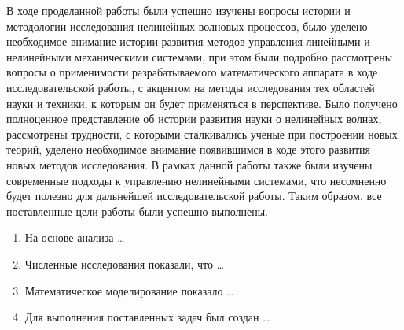 

В ходе проделанной работы были успешно изучены вопросы истории и методологии исследования нелинейных волновых процессов, было уделено необходимое внимание истории развития методов управления линейными и нелинейными механическими системами, при этом были подробно рассмотрены вопросы о применимости разрабатываемого математического аппарата в ходе исследовательской работы, с акцентом на методы исследования тех областей науки и техники, к которым он будет применяться в перспективе.
Было получено полноценное представление об истории развития науки о нелинейных волнах, рассмотрены трудности, с которыми сталкивались ученые при построении новых теорий, уделено необходимое внимание появившимся в ходе этого развития новых методов исследования. В рамках данной работы также были изучены современные подходы к управлению нелинейными системами, что несомненно будет полезно для дальнейшей исследовательской работы. Таким образом, все поставленные цели работы были успешно выполнены.

\begin{enumerate}
  \item На основе анализа \ldots
  \item Численные исследования показали, что \ldots
  \item Математическое моделирование показало \ldots
  \item Для выполнения поставленных задач был создан \ldots
\end{enumerate}
